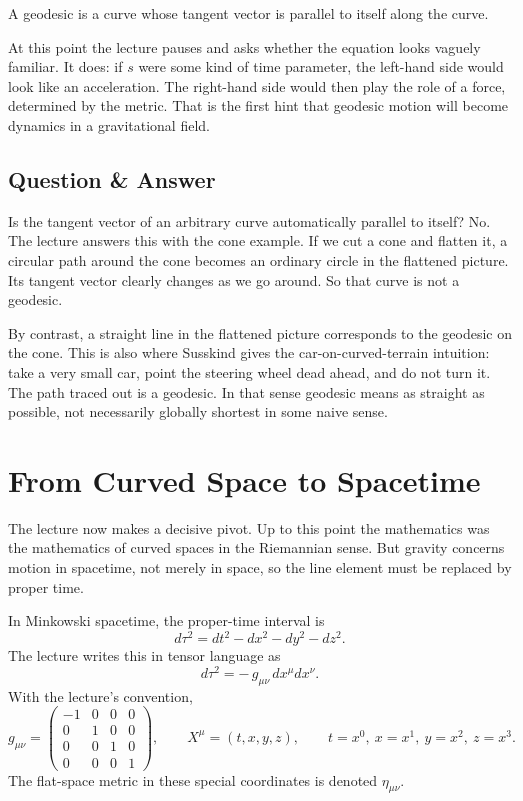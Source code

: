 \begin{definition}
A geodesic is a curve whose tangent vector is parallel to itself along the curve.
\end{definition}

At this point the lecture pauses and asks whether the equation looks vaguely familiar. It does: if \(s\) were some kind of time parameter, the left-hand side would look like an acceleration. The right-hand side would then play the role of a force, determined by the metric. That is the first hint that geodesic motion will become dynamics in a gravitational field.

\subsection{Question \& Answer}

Is the tangent vector of an arbitrary curve automatically parallel to itself? No. The lecture answers this with the cone example. If we cut a cone and flatten it, a circular path around the cone becomes an ordinary circle in the flattened picture. Its tangent vector clearly changes as we go around. So that curve is not a geodesic.

By contrast, a straight line in the flattened picture corresponds to the geodesic on the cone. This is also where Susskind gives the car-on-curved-terrain intuition: take a very small car, point the steering wheel dead ahead, and do not turn it. The path traced out is a geodesic. In that sense geodesic means as straight as possible, not necessarily globally shortest in some naive sense.

\section{From Curved Space to Spacetime}

The lecture now makes a decisive pivot. Up to this point the mathematics was the mathematics of curved spaces in the Riemannian sense. But gravity concerns motion in spacetime, not merely in space, so the line element must be replaced by proper time.

In Minkowski spacetime, the proper-time interval is
\begin{equation}
d\tau^2=dt^2-dx^2-dy^2-dz^2.
\end{equation}
The lecture writes this in tensor language as
\begin{equation}
d\tau^2=-\,g_{\mu\nu}\,dx^\mu dx^\nu.
\end{equation}
With the lecture's convention,
\begin{equation}
g_{\mu\nu}
=
\begin{pmatrix}
-1&0&0&0\\
0&1&0&0\\
0&0&1&0\\
0&0&0&1
\end{pmatrix},
\qquad
X^\mu=(t,x,y,z),
\qquad
t=x^0,\ x=x^1,\ y=x^2,\ z=x^3.
\end{equation}
The flat-space metric in these special coordinates is denoted \(\eta_{\mu\nu}\).

